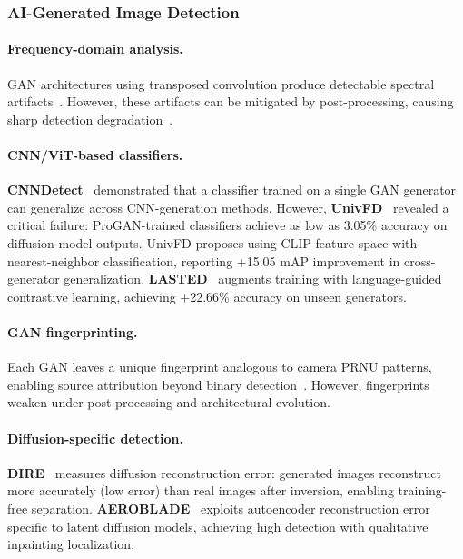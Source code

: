 \subsubsection{AI-Generated Image Detection}
\label{sec:detect-image}

\paragraph{Frequency-domain analysis.}
GAN architectures using transposed convolution produce detectable spectral artifacts~\cite{durall2020upconv,frank2020frequency}. However, these artifacts can be mitigated by post-processing, causing sharp detection degradation~\cite{dong2022thinktwice}.

\paragraph{CNN/ViT-based classifiers.}
\textbf{CNNDetect}~\cite{wang2020cnndetect} demonstrated that a classifier trained on a single GAN generator can generalize across CNN-generation methods. However, \textbf{UnivFD}~\cite{ojha2023univfd} revealed a critical failure: ProGAN-trained classifiers achieve as low as 3.05\% accuracy on diffusion model outputs. UnivFD proposes using CLIP feature space with nearest-neighbor classification, reporting +15.05 mAP improvement in cross-generator generalization. \textbf{LASTED}~\cite{wu2023lasted} augments training with language-guided contrastive learning, achieving +22.66\% accuracy on unseen generators.

\paragraph{GAN fingerprinting.}
Each GAN leaves a unique fingerprint analogous to camera PRNU patterns, enabling source attribution beyond binary detection~\cite{marra2018fingerprints,yu2019attribution}. However, fingerprints weaken under post-processing and architectural evolution.

\paragraph{Diffusion-specific detection.}
\textbf{DIRE}~\cite{wang2023dire} measures diffusion reconstruction error: generated images reconstruct more accurately (low error) than real images after inversion, enabling training-free separation. \textbf{AEROBLADE}~\cite{ricker2024aeroblade} exploits autoencoder reconstruction error specific to latent diffusion models, achieving high detection with qualitative inpainting localization.

